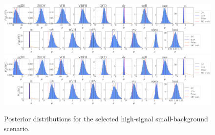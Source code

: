 \begin{figure}[h!]
	\centering
	\includegraphics[width=\linewidth]{figures/inference/194finalNoSummarye11000_posteriors}
	\includegraphics[width=\linewidth]{figures/inference/194finalSummary1Layer11000e300NodesCdim100_posteriors}
	\caption{Posterior distributions for the selected high-signal small-background scenario.}
	\label{fig:HS-SM}
\end{figure}